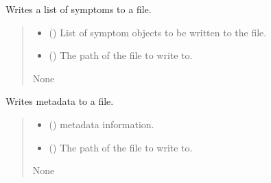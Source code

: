\documentclass[letterpaper,10pt,english]{sphinxmanual}
\begin{document}
\begin{fulllineitems}
\label{\detokenize{frise:frise.ecriture_fichier.EcrireListeSymptome}}
\pysigstartsignatures
{}
\pysigstopsignatures
\sphinxAtStartPar
Writes a list of symptoms to a file.
\begin{quote}\begin{description}
\begin{itemize}
\item {} 
\sphinxAtStartPar
{} () \textendash{} List of symptom objects to be written to the file.

\item {} 
\sphinxAtStartPar
{} () \textendash{} The path of the file to write to.

\end{itemize}

\sphinxAtStartPar
None

\end{description}\end{quote}

\end{fulllineitems}


\begin{fulllineitems}
\label{\detokenize{frise:frise.ecriture_fichier.EcrireMetaData}}
\pysigstartsignatures
{}
\pysigstopsignatures
\sphinxAtStartPar
Writes metadata to a file.
\begin{quote}\begin{description}
\begin{itemize}
\item {} 
\sphinxAtStartPar
{} () \textendash{} metadata information.

\item {} 
\sphinxAtStartPar
{} () \textendash{} The path of the file to write to.

\end{itemize}

\sphinxAtStartPar
None

\end{description}\end{quote}

\end{fulllineitems}
\end{document}
